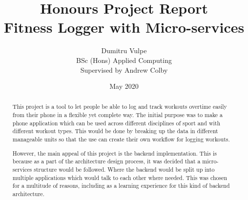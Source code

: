 \documentclass{article}
\title{Honours Project Report\\Fitness Logger with Micro-services}
\author{Dumitru Vulpe\\BSc (Hons) Applied Computing\\Supervised by Andrew Colby}
\date{May 2020}
\begin{document}
\maketitle


\vspace*{\fill/2}
\begin{abstract} 

This project is a tool to let people be able to log and track workouts overtime easily from their phone in a flexible yet complete way. The initial purpose was to make a phone application which can be used across different disciplines of sport and with different workout types. This would be done by breaking up the data in different manageable units so that the use can create their own workflow for logging workouts.

However, the main appeal of this project is the backend implementation. This is because as a part of the architecture design process, it was decided that a micro-services structure would be followed. Where the backend would be split up into multiple applications which would talk to each other where needed. This was chosen for a multitude of reasons, including as a learning experience for this kind of backend architecture.

\end{abstract}
\vspace*{\fill}

\newpage
\tableofcontents 
\newpage
\end{document}
